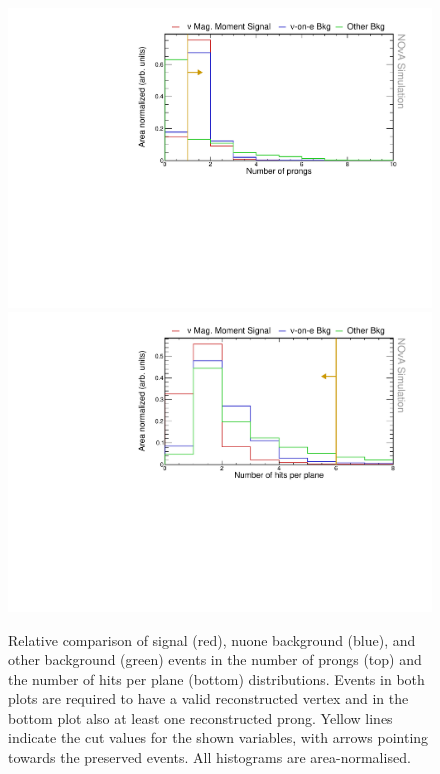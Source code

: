 \begin{figure}[hbtp]
\centering
\includegraphics[width=.9\textwidth]{Plots/NuMMEventSelection/N1Cut_NPng.pdf}
\includegraphics[width=.9\textwidth]{Plots/NuMMEventSelection/N1Cut_NHitsPPlane.pdf}
\caption[Prong and hits reconstruction quality cuts]{Relative comparison of signal (red), \acrshort{nuone} background (blue), and other background (green) events in the number of prongs (top) and the number of hits per plane (bottom) distributions. Events in both plots are required to have a valid reconstructed vertex and in the bottom plot also at least one reconstructed prong. Yellow lines indicate the cut values for the shown variables, with arrows pointing towards the preserved events. All histograms are area-normalised.}
\label{fig:NuMMCutsRecoQuality}
\end{figure}

